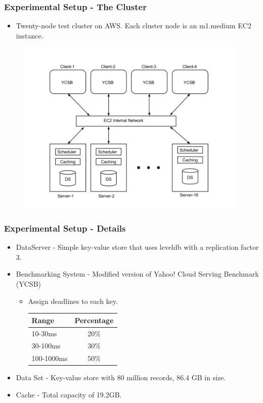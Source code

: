\documentclass{beamer}
\begin{document}
\begin{frame}
  \frametitle{Experimental Setup - The Cluster}
  \begin{itemize}
  \item Twenty-node test cluster on AWS. Each cluster node is an m1.medium
    EC2 instance.
  \end{itemize}
  \begin{figure}
    \begin{center}
      \centerline{\includegraphics[scale=0.25]{img/Experimental_Setup.png}}
    \end{center}
  \end{figure}
\end{frame}

\begin{frame}
  \frametitle{Experimental Setup - Details}
  \begin{itemize}
  \item DataServer - Simple key-value store that uses leveldb with a
    replication factor 3.
  \item Benchmarking System - Modified version of Yahoo! Cloud Serving
    Benchmark (YCSB)
    \begin{itemize}
    \item Assign deadlines to each key.\\
      \begin{tabular}{| l | c |}
        \hline
        Range & Percentage \\ \hline
        10-30ms & 20\% \\ \hline
        30-100ms & 30\% \\ \hline
        100-1000ms & 50\% \\ \hline
      \end{tabular}
    \end{itemize}
  \item Data Set - Key-value store with 80 million records, 86.4 GB in size.
  \item Cache - Total capacity of 19.2GB.
  \end{itemize}
\end{frame}
\end{document}
